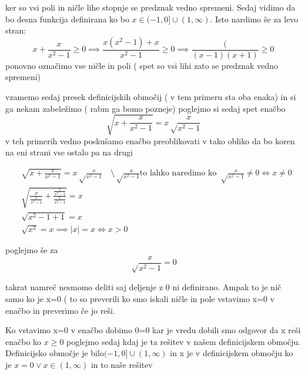 \documentclass[a4paper]{article}
\begin{document}
 ker so vsi poli in ničle lihe stopnje se predznak vedno spremeni. Sedaj vidimo da bo desna funkcija definirana ko bo \(x\in(-1,0]\cup(1,\infty)\). Isto nardimo še za levo stran:
\[
x+\frac{x}{x^{2}-1}\geq0\implies\frac{x(x^{2}-1)+x}{x^{2}-1}\geq0\implies\frac{(}{(x-1)(x+1)}\geq0
\]
ponovno označimo vse ničle in poli ( spet so vsi lihi zato se predznak vedno spremeni)\\
\begin{center}
 \end{center}
vzamemo sedaj presek definicijskih območij ( v tem primeru sta oba enaka) in si ga nekam zabeležimo ( rabm ga bomo pozneje)
\newpage
poglejmo si sedaj spet enačbo
\[
\sqrt{x+\frac{x}{x^{2}-1}}=x\sqrt\frac{x}{x^{2}-1}
\]
v teh primerih  vedno poskušamo enačbo preoblikovati v tako obliko da bo koren na eni strani vse ostalo pa na drugi

\begin{align*}
&\sqrt{x+\frac{x}{x^{2}-1}}=x\sqrt\frac{x}{x^{2}-1}\quad \setminus\sqrt\frac{x}{x^{2}-1}\text{to lahko naredimo ko \(\sqrt\frac{x}{x^{2}-1}\neq0\Leftrightarrow x\neq0\)}
\\
&\sqrt{\frac{x}{\frac{x}{x^{2}-1}}+\frac{\frac{x}{x^{2}-1}}{\frac{x}{x^{2}-1}}}=x\\
&\sqrt{x^{2}-1+1}=x\\
&\sqrt{x^{2}}=x\implies|x|=x\Leftrightarrow x>0
\end{align*}

poglejmo še za 
\[
\sqrt\frac{x}{x^{2}-1}=0
\]

takrat namreč nesmomo deliti saj deljenje z 0 ni definirano. Ampak to je nič samo ko je x=0 ( to so preverili ko smo iskali ničle in pole vstavimo x=0 v enačbo in preverimo če jo reši.

Ko vstavimo x=0 v enačbo dobimo 0=0 kar je vredu 
\vspace{0.2cm}
dobili smo odgovor da x reši enačbo ko \(x\geq0\) poglejmo sedaj kdaj je ta rešitev v našem definicijskem območju. Definicijsko območje je bilo\((-1,0]\cup(1,\infty)\) in x je v definicijskem območju ko je \(x=0\lor x\in(1,\infty)\) in to naše rešitev
\end{document}
